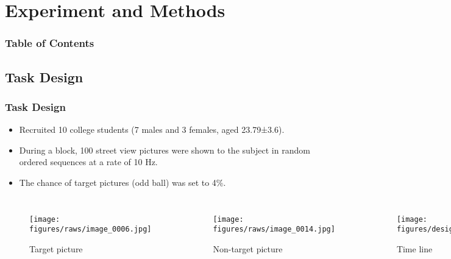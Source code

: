 \documentclass[aspectratio=169]{beamer}
\begin{document}
\section{Experiment and Methods}

\begin{frame}[plain]
    \frametitle{Table of Contents}
\end{frame}

\subsection{Task Design}

\begin{frame}
    \frametitle{Task Design}

    \begin{itemize}
        \item Recruited 10 college students (7 males and 3 females, aged 23.79±3.6).
        \item During a block, 100 street view pictures were shown to the subject in random ordered sequences at a rate of 10 Hz.
        \item The chance of target pictures (odd ball) was set to 4\%.
    \end{itemize}

    \begin{columns}

        \begin{figure}[h]
            \centering
            \texttt{[image: figures/raws/image\_0006.jpg]}
            \caption{Target picture}
        \end{figure}


        \begin{figure}[h]
            \centering
            \texttt{[image: figures/raws/image\_0014.jpg]}
            \caption{Non-target picture}
        \end{figure}


        \begin{figure}[h]
            \centering
            \texttt{[image: figures/design.png]}
            \caption{Time line}
        \end{figure}

    \end{columns}

\end{frame}
\end{document}
